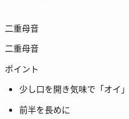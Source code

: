\documentclass[aspectratio=169,xcolor={dvipsnames,table}]{beamer}
\begin{document}
\begin{frame}
\hypertarget{today}{}

\centering
  \textcolor{white}{\Huge\bfseries Today's Pronunciation}

 \vspace{30pt}

  \textcolor{white}{\Huge\bfseries {}}
\end{frame}
\begin{frame}[plain]{二重母音 }

 {\Large 二重母音} {\Huge {}}


\normalsize
ポイント

\begin{itemize}[circle]
 \item 少し口を開き気味で「オイ」
 \item 前半を長めに
\end{itemize}

\hfill\hyperlink{ex}{}

\end{frame}
\end{document}
